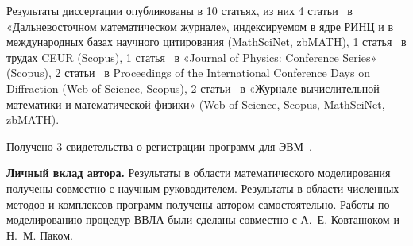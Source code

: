     {\publications}
    Результаты диссертации опубликованы в 10 статьях, из них 4
    статьи~\cite{mesenev_23_opt, mesenev_22_penalty, mesenev_20_alg, mesenev_18_boundary}
    в «Дальневосточном математическом журнале», индексируемом
    в ядре РИНЦ и в международных базах научного цитирования (MathSciNet,
    zbMATH), 1 статья~\cite{mesenev_20_opt_proc} в трудах CEUR (Scopus),
    1 статья~\cite{mesenev_23_math}
    в «Journal of Physics: Conference Series» (Scopus),
    2 статьи~\cite{mesenev_21_optimal_proc, mesenev_23_inv_proc}
    в Proceedings of the International Conference Days on Diffraction (Web of Science, Scopus),
    2 статьи~\cite{mesenev_23_problem, Mesenev_22_analysis}
    в «Журнале вычислительной математики и математической физики»
    (Web of Science, Scopus, MathSciNet, zbMATH).

    Получено 3 свидетельства о регистрации программ для ЭВМ~\cite{progbib1, progbib2, progbib3}.

    \textbf{Личный вклад автора.}
    Результаты в области математического моделирования получены совместно с научным руководителем.
    Результаты в области численных методов и комплексов программ получены автором самостоятельно.
    Работы по моделированию процедур ВВЛА были сделаны совместно с А.\ Е. Ковтанюком и Н.\ М. Паком.
